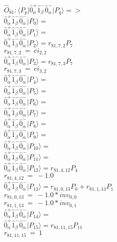 \documentclass[14pt]{article}
\begin{document}
    $\hat{O}_{81}:  \langle{P_p}\vert \hat{0}_{\alpha}^{+}\hat{1}_{\beta}^{-}\hat{0}_{\alpha}^{-} \vert{P_q}\rangle => $ \\ 
    $ \hat{0}_{\alpha}^{+}\hat{1}_{\beta}^{-}\hat{0}_{\alpha}^{-} \vert{P_{0}}\rangle =  $ \\ 
    $ \hat{0}_{\alpha}^{+}\hat{1}_{\beta}^{-}\hat{0}_{\alpha}^{-} \vert{P_{1}}\rangle =  $ \\ 
    $ \hat{0}_{\alpha}^{+}\hat{1}_{\beta}^{-}\hat{0}_{\alpha}^{-} \vert{P_{2}}\rangle = {r}_{81,7,2}P_{7} $ \\ 
    ${r}_{81,7,2}\ =\ {ci}_{2,2} $ \\ 
    $ \hat{0}_{\alpha}^{+}\hat{1}_{\beta}^{-}\hat{0}_{\alpha}^{-} \vert{P_{3}}\rangle = {r}_{81,7,3}P_{7} $ \\ 
    ${r}_{81,7,3}\ =\ {ci}_{3,2} $ \\ 
    $ \hat{0}_{\alpha}^{+}\hat{1}_{\beta}^{-}\hat{0}_{\alpha}^{-} \vert{P_{4}}\rangle =  $ \\ 
    $ \hat{0}_{\alpha}^{+}\hat{1}_{\beta}^{-}\hat{0}_{\alpha}^{-} \vert{P_{5}}\rangle =  $ \\ 
    $ \hat{0}_{\alpha}^{+}\hat{1}_{\beta}^{-}\hat{0}_{\alpha}^{-} \vert{P_{6}}\rangle =  $ \\ 
    $ \hat{0}_{\alpha}^{+}\hat{1}_{\beta}^{-}\hat{0}_{\alpha}^{-} \vert{P_{7}}\rangle =  $ \\ 
    $ \hat{0}_{\alpha}^{+}\hat{1}_{\beta}^{-}\hat{0}_{\alpha}^{-} \vert{P_{8}}\rangle =  $ \\ 
    $ \hat{0}_{\alpha}^{+}\hat{1}_{\beta}^{-}\hat{0}_{\alpha}^{-} \vert{P_{9}}\rangle =  $ \\ 
    $ \hat{0}_{\alpha}^{+}\hat{1}_{\beta}^{-}\hat{0}_{\alpha}^{-} \vert{P_{10}}\rangle =  $ \\ 
    $ \hat{0}_{\alpha}^{+}\hat{1}_{\beta}^{-}\hat{0}_{\alpha}^{-} \vert{P_{11}}\rangle =  $ \\ 
    $ \hat{0}_{\alpha}^{+}\hat{1}_{\beta}^{-}\hat{0}_{\alpha}^{-} \vert{P_{12}}\rangle = {r}_{81,4,12}P_{4} $ \\ 
    ${r}_{81,4,12}\ =\ -1.0 $ \\ 
    $ \hat{0}_{\alpha}^{+}\hat{1}_{\beta}^{-}\hat{0}_{\alpha}^{-} \vert{P_{13}}\rangle = {r}_{81,0,13}P_{0}+{r}_{81,1,13}P_{1} $ \\ 
    ${r}_{81,0,13}\ =\ -1.0*{inv}_{0,0} $ \\ 
    ${r}_{81,1,13}\ =\ -1.0*{inv}_{0,1} $ \\ 
    $ \hat{0}_{\alpha}^{+}\hat{1}_{\beta}^{-}\hat{0}_{\alpha}^{-} \vert{P_{14}}\rangle =  $ \\ 
    $ \hat{0}_{\alpha}^{+}\hat{1}_{\beta}^{-}\hat{0}_{\alpha}^{-} \vert{P_{15}}\rangle = {r}_{81,11,15}P_{11} $ \\ 
    ${r}_{81,11,15}\ =\ 1 $ \\ 
    
\end{document}
